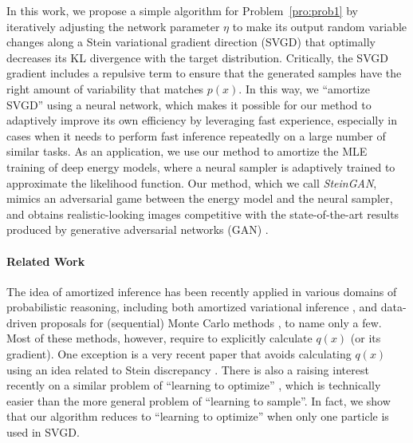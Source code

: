 \documentclass{article} \usepackage{iclr2017_conference,times}
\begin{document}
In this work, we propose a simple algorithm for Problem~\ref{pro:prob1} 
by iteratively adjusting the network parameter $\eta$ to make its output random variable changes along 
a Stein variational gradient direction (SVGD) \citep{liu2016stein} that optimally decreases its KL divergence 
with the target distribution. 
Critically, the SVGD gradient includes a repulsive term to ensure that the generated samples have the right amount of variability that matches $p(x).$ 
In this way, we ``amortize SVGD'' using a neural network, which makes it possible for our method to adaptively improve its own efficiency  
by leveraging fast experience, especially in cases when it needs to perform fast inference repeatedly on a large number of similar tasks. 
As an application, we use our method to amortize the MLE training of deep energy models, where a neural sampler is adaptively trained to 
approximate the likelihood function. Our method, which we call \emph{SteinGAN}, mimics an adversarial game 
between the energy model and the neural sampler, and obtains realistic-looking images competitive with the state-of-the-art results produced by generative adversarial networks (GAN) \citep{goodfellow2014generative, radford2015unsupervised}. 

\paragraph {Related Work} 
The idea of amortized inference \citep{gershman2014amortized}
 has been recently applied in various domains of probabilistic reasoning, 
 including both amortized variational inference \citep[e.g.,][]{kingma2013auto, jimenez2015variational}, 
and data-driven proposals for (sequential) Monte Carlo methods \citep[e.g.,][]{paige2016inference}, 
to name only a few. Most of these methods, however, 
 require to explicitly calculate $q(x)$ (or its gradient). 
 One exception is a very recent paper \citep{operator} that avoids calculating $q(x)$ using an idea related to Stein discrepancy \citep{gorham2015measuring, liu2016kernelized, oates2014control, chwialkowski2016kernel}.
There is also a raising interest recently on a similar problem of ``learning to optimize'' \citep[e.g.,][]{andrychowicz2016learning, daniel2016learning, li2016learning}, which is technically easier than the more general problem of ``learning to sample''. In fact, we show that our algorithm reduces to ``learning to optimize'' when only one particle is used in SVGD. 
\end{document}
